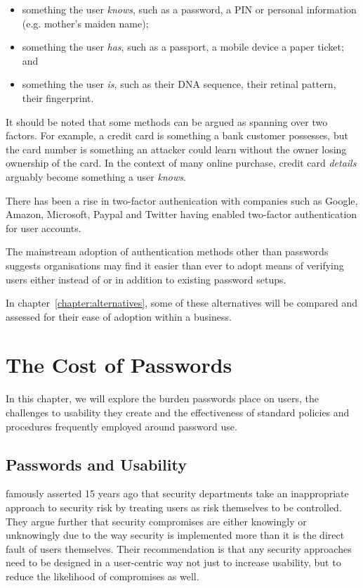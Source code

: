 \documentclass{report}
\begin{document}
\begin{itemize}
  \item something the user \emph{knows}, such as a password, a PIN or
    personal information (e.g. mother's maiden name);
  \item something the user \emph{has}, such as a passport, a mobile device
    a paper ticket; and
  \item something the user \emph{is}, such as their DNA sequence,
    their retinal pattern, their fingerprint.
\end{itemize}

It should be noted that some methods can be argued as spanning
over two factors. For example, a credit card is something
a bank customer possesses, but the card number is something
an attacker could learn without the owner losing ownership
of the card. In the context of many online purchase, credit
card \emph{details} arguably become something a user \emph{knows}.

There
has been a rise in two-factor authenication with companies
such as Google, Amazon, Microsoft, Paypal and Twitter having enabled
two-factor authentication for user accounts.

The mainstream adoption of authentication methods other than
passwords suggests organisations may find it easier than ever to adopt
means of verifying users either instead of or in addition to
existing password setups.

In chapter~\ref{chapter:alternatives}, some of these alternatives will be
compared and assessed for their ease of adoption within a business.

\chapter{The Cost of Passwords}
\label{chapter:costs}

In this chapter, we will explore the burden passwords place
on users, the challenges to usability they create and
the effectiveness of standard policies and procedures
frequently employed around password use.

\section{Passwords and Usability}

\textcite{adams1999users} famously asserted 15 years ago that security
departments take an inappropriate approach to security risk
by treating users as risk themselves to be controlled. They
argue further that security compromises are either knowingly
or unknowingly due to the way security is implemented more than
it is the direct fault of users themselves. Their recommendation
is that any security approaches need to be designed in
a user-centric way not just to increase usability, but to
reduce the likelihood of compromises as well.
\end{document}
